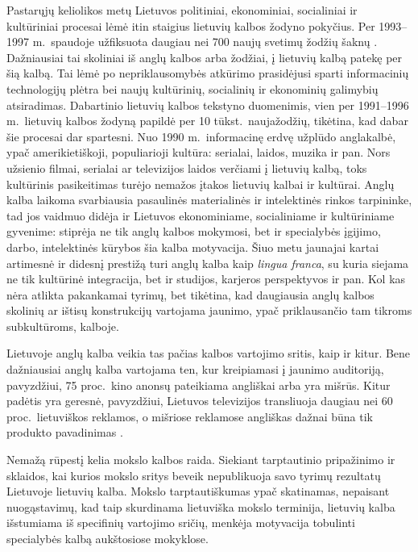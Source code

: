 \begin{multicols}{2}
Pastarųjų keliolikos metų Lietuvos politiniai, ekonominiai, socialiniai ir kultūriniai procesai lėmė itin staigius lietuvių kalbos žodyno pokyčius. Per 1993–1997 m.~spaudoje užfiksuota daugiau nei 700 naujų svetimų žodžių šaknų \cite{nbi1}. Dažniausiai tai skoliniai iš anglų kalbos arba žodžiai, į lietuvių kalbą patekę per šią kalbą. Tai lėmė po nepriklausomybės atkūrimo prasidėjusi sparti informacinių technologijų plėtra bei naujų kultūrinių, socialinių ir ekonominių galimybių atsiradimas. Dabartinio lietuvių kalbos tekstyno duomenimis, vien per 1991–1996 m.~lietuvių kalbos žodyną papildė per 10 tūkst.~naujažodžių, tikėtina, kad dabar šie procesai dar spartesni.
Nuo 1990 m.~informacinę erdvę užplūdo anglakalbė, ypač amerikietiškoji, populiarioji kultūra: serialai, laidos, muzika ir pan. Nors užsienio filmai, serialai ar televizijos laidos verčiami į lietuvių kalbą, toks kultūrinis pasikeitimas turėjo nemažos įtakos lietuvių kalbai ir kultūrai. Anglų kalba laikoma svarbiausia pasaulinės materialinės ir intelektinės rinkos tarpininke, tad jos vaidmuo didėja ir Lietuvos ekonominiame, socialiniame ir kultūriniame gyvenime: stiprėja ne tik anglų kalbos mokymosi, bet ir specialybės įgijimo, darbo, intelektinės kūrybos šia kalba motyvacija. Šiuo metu jaunajai kartai artimesnė ir didesnį prestižą turi anglų kalba kaip \textit{lingua franca}, su kuria siejama ne tik kultūrinė integracija, bet ir studijos, karjeros perspektyvos ir pan. Kol kas nėra atlikta pakankamai tyrimų, bet tikėtina, kad daugiausia anglų kalbos skolinių ar ištisų konstrukcijų vartojama jaunimo, ypač priklausančio tam tikroms subkultūroms, kalboje.

Lietuvoje anglų kalba veikia tas pačias kalbos vartojimo sritis, kaip ir kitur. Bene dažniausiai anglų kalba vartojama ten, kur kreipiamasi į jaunimo auditoriją, pavyzdžiui, 75 proc.~kino anonsų pateikiama angliškai arba yra mišrūs. Kitur padėtis yra geresnė, pavyzdžiui, Lietuvos televizijos transliuoja daugiau nei 60 proc.~lietuviškos reklamos, o mišriose reklamose angliškas dažnai būna tik produkto pavadinimas \cite{nbi1}.

Nemažą rūpestį kelia mokslo kalbos raida. Siekiant tarptautinio pripažinimo ir sklaidos, kai kurios mokslo sritys beveik nepublikuoja savo tyrimų rezultatų Lietuvoje lietuvių kalba. Mokslo tarptautiškumas ypač skatinamas, nepaisant nuogąstavimų, kad taip skurdinama lietuviška mokslo terminija, lietuvių kalba išstumiama iš specifinių vartojimo sričių, menkėja motyvacija tobulinti specialybės kalbą aukštosiose mokyklose.


\end{multicols}
